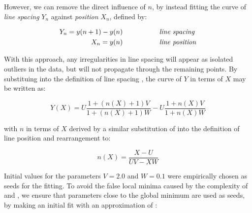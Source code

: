 {%
However, we can remove the direct influence of $n$, by instead fitting
the curve of {\em line spacing} $Y_n$ against {\em position} $X_n$, defined by:


\begin{eqnarray}
Y_n = y(n+1)-y(n) & \mbox{~~~~~~~~~~~~~~~ \it line spacing} \label{linespacingsdefneqn} \\
X_n = y(n) & \mbox{~~~~~~~~~~~~~~~ \it line position} \label{linepositiondefneqn}
\end{eqnarray}

With this approach, any irregularities in line spacing will appear as isolated
outliers in the data, but will not propagate through the remaining points. %
By substituing 
into the definition of line spacing , the curve of
$Y$ in terms of $X$ may be written as: 
}

\begin{equation}
Y(X) = U \frac{1+(n(X)+1)V}{1+(n(X)+1)W} - U \frac{1+n(X)V}{1+n(X)W}
\label{fittingeqn}
\end{equation}

{\parindent 0mm
with $n$ in terms of $X$ derived by a similar substitution of  into the definition of line position  and rearrangement to:
}

\begin{equation}
n(X) = \frac{X-U}{UV-XW}
\label{nfromxeqn}
\end{equation}

Initial values for the parameters $V=2.0$ and $W=0.1$ were empirically chosen as 
seeds for the fitting.
To avoid the false local minima caused by the complexity of  and ,
we ensure that parameters close to the global minimum are used as seeds,
by making an initial fit with an approximation of :

